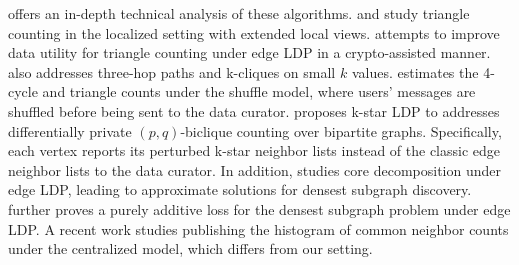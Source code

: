 \cite{eden2023triangle} offers an in-depth technical analysis of these algorithms. 
\cite{liu2022collecting} and \cite{sun2019analyzing}  study triangle counting in the localized setting with extended local views. 
{\cite{liu2023cargo} attempts to improve data utility for triangle counting under edge LDP in a crypto-assisted manner.} 
\cite{sun2019analyzing} also addresses three-hop paths and k-cliques on small $k$ values. 
\cite{imola2022differentially} estimates the 4-cycle and triangle counts under the shuffle model, where users' messages are shuffled before being sent to the data curator. 
\cite{sun2024k} proposes k-star LDP to addresses differentially private $(p,q)$-biclique counting over bipartite graphs. Specifically, each vertex reports its perturbed k-star neighbor lists instead of the classic edge neighbor lists to the data curator. 
In addition, \cite{dhulipala2022differential} studies core decomposition under edge LDP, leading to approximate solutions for densest subgraph discovery. 
\cite{dinitz2023improved} further proves a purely additive loss for the densest subgraph problem under edge LDP. 
{A recent work \cite{lv2024publishing} studies publishing the histogram of common neighbor counts under the centralized model, which differs from our setting. }





